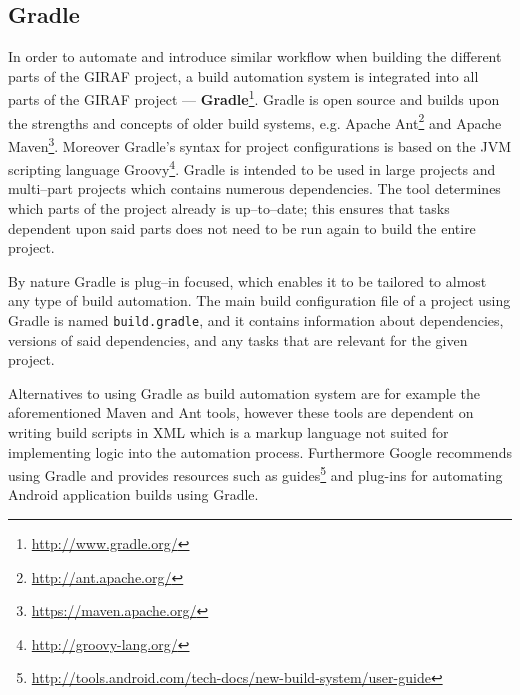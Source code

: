 \subsection{Gradle}\label{subsec:gradle}
In order to automate and introduce similar workflow when building the different parts of the GIRAF project, a build automation system is integrated into all parts of the GIRAF project --- \textbf{Gradle}\footnote{\url{http://www.gradle.org/}}.
Gradle is open source and builds upon the strengths and concepts of older build systems, e.g. Apache Ant\footnote{\url{http://ant.apache.org/}} and Apache Maven\footnote{\url{https://maven.apache.org/}}.
Moreover Gradle's syntax for project configurations is based on the JVM scripting language Groovy\footnote{\url{http://groovy-lang.org/}}.
Gradle is intended to be used in large projects and multi--part projects which contains numerous dependencies.
The tool determines which parts of the project already is up--to--date; this ensures that tasks dependent upon said parts does not need to be run again to build the entire project.

By nature Gradle is plug--in focused, which enables it to be tailored to almost any type of build automation.
The main build configuration file of a project using Gradle is named \texttt{build.gradle}, and it contains information about dependencies, versions of said dependencies, and any tasks that are relevant for the given project.

Alternatives to using Gradle as build automation system are for example the aforementioned Maven and Ant tools, however these tools are dependent on writing build scripts in XML which is a markup language not suited for implementing logic into the automation process.
Furthermore Google recommends using Gradle and provides resources such as guides\footnote{\url{http://tools.android.com/tech-docs/new-build-system/user-guide}} and plug-ins for automating Android application builds using Gradle.
